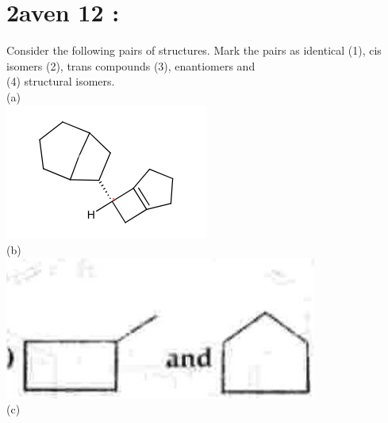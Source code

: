 \documentclass[10pt]{article}
\begin{document}
\section*{2aven 12 :}
Consider the following pairs of structures. Mark the pairs as identical (1), cis isomers (2), trans compounds (3), enantiomers and\\
(4) structural isomers.\\
(a)\\
\includegraphics{smile-03cead6520f7fb0f3a4e80e8c69cb997ac2e80c1}\\
(b)\\
\includegraphics[max width=\textwidth, center]{2025_01_28_8470952b98110cec3aabg-118(1)}\\
(c)
\end{document}
